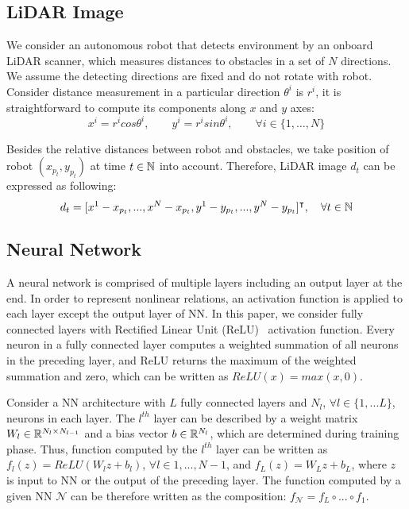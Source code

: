 \subsection{LiDAR Image}

We consider an autonomous robot that detects environment by an onboard LiDAR scanner, 
which measures distances to obstacles in a set of $N$ directions.
We assume the detecting directions are fixed and do not rotate with robot.
Consider distance measurement in a particular direction $\theta^i$ is $r^i$,
it is straightforward to compute its components along $x$ and $y$ axes:
\begin{equation}
    \label{eq:distance}
    x^i = r^i cos \theta^i, \qquad y^i = r^i sin \theta^i, \qquad \forall i\in\{1,\ldots,N\}
\end{equation}

Besides the relative distances between robot and obstacles, we take position of robot $(x_{p_t}, y_{p_t})$
at time $t \in {\mathbb{N}}$ into account.
Therefore, LiDAR image $d_t$ can be expressed as following:
\begin{equation}
    \label{eq:image}
    d_t = [x^1-x_{p_t},..., x^N-x_{p_t}, y^1-y_{p_t},..., y^N-y_{p_t}]^\intercal, \quad \forall t \in {\mathbb{N}}
\end{equation}




\subsection{Neural Network}

A neural network is comprised of multiple layers including an output layer at the end.
In order to represent nonlinear relations, an activation function is applied to each layer except the output layer of NN.
In this paper, we consider fully connected layers with Rectified Linear Unit (ReLU)~\cite{Hinton2010ReLU} activation function.
Every neuron in a fully connected layer computes a weighted summation of all neurons in the preceding layer, 
and ReLU returns the maximum of the weighted summation and zero, which can be written as $ReLU(x) = max(x, 0)$.

Consider a NN architecture with $L$ fully connected layers and $N_l$, $\forall l \in \{1,...L\}$, neurons in each layer.
The $l^{th}$ layer can be described by a weight matrix $W_l \in {\mathbb{R}}^{N_l \times N_{l-1}}$ and a bias vector $b \in {\mathbb{R}}^{N_l}$,
which are determined during training phase.
Thus, function computed by the $l^{th}$ layer can be written as $f_l(z) = ReLU(W_l z + b_l)$, $\forall l \in {1, ..., N-1}$, 
and $f_L(z) = W_L z + b_L$, where $z$ is input to NN or the output of the preceding layer.
The function computed by a given NN $\mathcal{N}$ can be therefore written as the composition: 
$f_{\mathcal{N}} = f_L \circ ... \circ f_1$.

